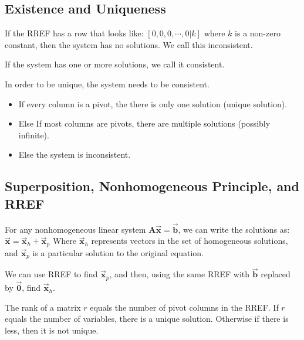 \documentclass[12pt,landscape,twocolumn]{article}
\let\oldvec\vec
\renewcommand{\vec}[1]{\oldvec{\mathbf{ #1 } } }                    %
\begin{document}
    \subsection{Existence and Uniqueness}
    If the RREF has a row that looks like:
    $
        [0, 0, 0, \cdots, 0 | k]
    $
    where $k$ is a non-zero constant, then the system has no solutions. We call this inconsistent.

    If the system has one or more solutions, we call it consistent.

    In order to be unique, the system needs to be consistent.
        \begin{itemize}
            \item If every column is a pivot, the there is only one solution (unique solution).
            \item Else If most columns are pivots, there are multiple solutions (possibly infinite).
            \item Else the system is inconsistent.
        \end{itemize}

    \subsection{Superposition, Nonhomogeneous Principle, and RREF}
    For any nonhomogeneous linear system $\mathbf{A}\vec{x} = \vec{b}$, we can write the solutions as:
    $
        \vec{x} = \vec{x}_h + \vec{x}_p
    $
    Where $\vec{x}_h$ represents vectors in the set of homogeneous solutions, and $\vec{x}_p$ is a particular solution to the original equation.

    We can use RREF to find $\vec{x}_p$, and then, using the same RREF with $\vec{b}$ replaced by $\vec{0}$, find $\vec{x}_h$.

    The rank of a matrix $r$ equals the number of pivot columns in the RREF. If $r$ equals the number of variables, there is a unique solution. Otherwise if there is less, then it is not unique.
\end{document}
